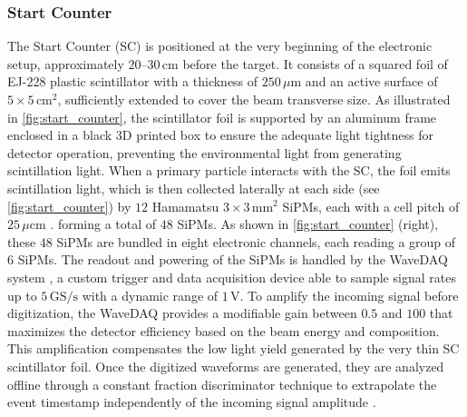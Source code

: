 \subsubsection{Start Counter}\label{sssec:start_counter}
The Start Counter (SC) is positioned at the very beginning of the electronic setup, approximately $20$--$30\,\mathrm{cm}$ before the target. It consists of a squared foil of EJ-228 plastic scintillator \cite{ej228datasheet} with a thickness of $250\,\mu\mathrm{m}$ and an active surface of $5\times5\,\mathrm{cm}^2$, sufficiently extended to cover the beam transverse size. As illustrated in \autoref{fig:start_counter}, the scintillator foil is supported by an aluminum frame enclosed in a black 3D printed box to ensure the adequate light tightness for detector operation, preventing the environmental light from generating scintillation light. When a primary particle interacts with the SC, the foil emits scintillation light, which is then collected laterally at each side (see \autoref{fig:start_counter}) by $12$ Hamamatsu $3\times3\,\mathrm{mm}^2$ SiPMs, each with a cell pitch of $25\,\mu\mathrm{cm}$ \cite{sipms_SC_datasheet}. forming a total of $48$ SiPMs. As shown in \autoref{fig:start_counter} (right), these $48$ SiPMs are bundled in eight electronic channels, each reading a group of $6$ SiPMs. The readout and powering of the SiPMs is handled by the WaveDAQ system \cite{GALLI2019399}, a custom trigger and data acquisition device able to sample signal rates up to $5\,\mathrm{GS/s}$ with a dynamic range of $1\,\mathrm{V}$. To amplify the incoming signal before digitization, the WaveDAQ provides a modifiable gain between $0.5$ and $100$ that maximizes the detector efficiency based on the beam energy and composition. This amplification compensates the low light yield generated by the very thin SC scintillator foil. Once the digitized waveforms are generated, they are analyzed offline through a constant fraction discriminator technique to extrapolate the event timestamp independently of the incoming signal amplitude \cite{Wiebusch_2024}.

